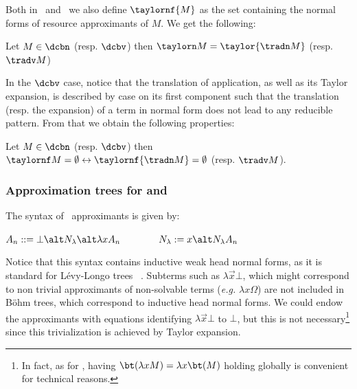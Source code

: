 \begin{example}
\end{example}
	
Both in \dcbv\ and \dcbn\, we also define $\taylornf{M}$ as the set
containing the normal forms of resource approximants of $M$. We get the following: 

\begin{lemma}
	\label{lem:taylor_trad_dcbn_dcbv}
	Let $M \in \dcbn$ (resp. $\dcbv$) then $\taylorn M = \taylor{\tradn M}$ (resp. $\tradv M$)
\end{lemma}

In the $\dcbv$ case, notice that the translation of application, as
well as its Taylor expansion, is described by case on its first
component such that the translation (resp. the expansion) of a term in
normal form does not lead to any reducible pattern.
From that we obtain the following properties:

\begin{corollary}\label{cor:tradn_tnf-tradv-tnf}
	Let $M\in\dcbn$ (resp. $\dcbv$) then $\taylornf
	M=\emptyset\leftrightarrow \taylornf{\tradn M}=\emptyset$ (resp. $\tradv M$).
\end{corollary}

\subsubsection{Approximation trees for \dcbn{} and \dcbv{}}

\begin{definition}The syntax of \dcbn\ approximants is given by:
\begin{center}
	$A_n ::=  \bot\alt N_{\lambda} \alt \lambda x A_n
	\qquad\qquad N_{\lambda } := x  \alt N_{\lambda } A_n$
\end{center}
\end{definition}
 
Notice that this syntax contains inductive weak head normal forms,  as it is standard for
Lévy-Longo trees ~\cite{Longo83}. Subterms such as $\lambda\vec x\bot$,
which might correspond to non trivial approximants of non-solvable terms (\emph{e.g.} $\lambda
x\Omega$) are not included in Böhm trees, which correspond to inductive head normal forms.  We could endow the approximants with equations identifying $\lambda\vec x\bot$
to $\bot$, but this is not necessary\footnote{
	In fact, as for \dbang, having $\bt(\lambda xM)=\lambda x\bt(M)$ holding globally is
	convenient for technical reasons.
}
since this trivialization is achieved by Taylor
expansion. %

